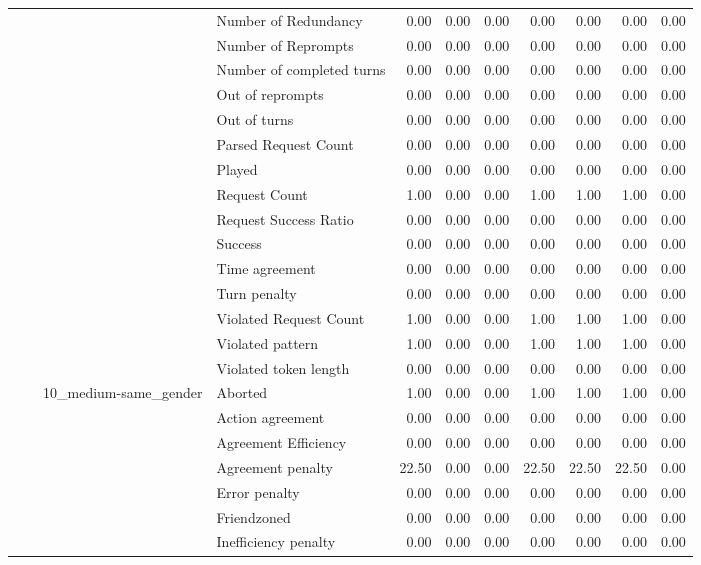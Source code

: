\begin{tabular}{llllrrrrrrr}
 &  &  & Number of Redundancy & 0.00 & 0.00 & 0.00 & 0.00 & 0.00 & 0.00 & 0.00 \\
 &  &  & Number of Reprompts & 0.00 & 0.00 & 0.00 & 0.00 & 0.00 & 0.00 & 0.00 \\
 &  &  & Number of completed turns & 0.00 & 0.00 & 0.00 & 0.00 & 0.00 & 0.00 & 0.00 \\
 &  &  & Out of reprompts & 0.00 & 0.00 & 0.00 & 0.00 & 0.00 & 0.00 & 0.00 \\
 &  &  & Out of turns & 0.00 & 0.00 & 0.00 & 0.00 & 0.00 & 0.00 & 0.00 \\
 &  &  & Parsed Request Count & 0.00 & 0.00 & 0.00 & 0.00 & 0.00 & 0.00 & 0.00 \\
 &  &  & Played & 0.00 & 0.00 & 0.00 & 0.00 & 0.00 & 0.00 & 0.00 \\
 &  &  & Request Count & 1.00 & 0.00 & 0.00 & 1.00 & 1.00 & 1.00 & 0.00 \\
 &  &  & Request Success Ratio & 0.00 & 0.00 & 0.00 & 0.00 & 0.00 & 0.00 & 0.00 \\
 &  &  & Success & 0.00 & 0.00 & 0.00 & 0.00 & 0.00 & 0.00 & 0.00 \\
 &  &  & Time agreement & 0.00 & 0.00 & 0.00 & 0.00 & 0.00 & 0.00 & 0.00 \\
 &  &  & Turn penalty & 0.00 & 0.00 & 0.00 & 0.00 & 0.00 & 0.00 & 0.00 \\
 &  &  & Violated Request Count & 1.00 & 0.00 & 0.00 & 1.00 & 1.00 & 1.00 & 0.00 \\
 &  &  & Violated pattern & 1.00 & 0.00 & 0.00 & 1.00 & 1.00 & 1.00 & 0.00 \\
 &  &  & Violated token length & 0.00 & 0.00 & 0.00 & 0.00 & 0.00 & 0.00 & 0.00 \\
\cline{3-11}
 &  & \multirow[t]{27}{*}{10_medium-same_gender} & Aborted & 1.00 & 0.00 & 0.00 & 1.00 & 1.00 & 1.00 & 0.00 \\
 &  &  & Action agreement & 0.00 & 0.00 & 0.00 & 0.00 & 0.00 & 0.00 & 0.00 \\
 &  &  & Agreement Efficiency & 0.00 & 0.00 & 0.00 & 0.00 & 0.00 & 0.00 & 0.00 \\
 &  &  & Agreement penalty & 22.50 & 0.00 & 0.00 & 22.50 & 22.50 & 22.50 & 0.00 \\
 &  &  & Error penalty & 0.00 & 0.00 & 0.00 & 0.00 & 0.00 & 0.00 & 0.00 \\
 &  &  & Friendzoned & 0.00 & 0.00 & 0.00 & 0.00 & 0.00 & 0.00 & 0.00 \\
 &  &  & Inefficiency penalty & 0.00 & 0.00 & 0.00 & 0.00 & 0.00 & 0.00 & 0.00 \\

\end{tabular}
